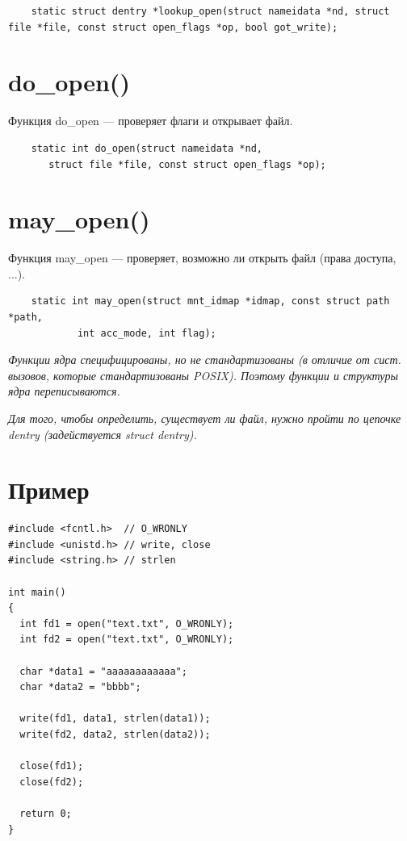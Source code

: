 \begin{lstlisting}
    static struct dentry *lookup_open(struct nameidata *nd, struct file *file, const struct open_flags *op, bool got_write);
\end{lstlisting}

\section{do\_open()}
Функция do\_open --- проверяет флаги и открывает файл.

\begin{lstlisting}
    static int do_open(struct nameidata *nd,
       struct file *file, const struct open_flags *op);
\end{lstlisting}

\section{may\_open()}
Функция may\_open --- проверяет, возможно ли открыть файл (права доступа, ...).

\begin{lstlisting}
    static int may_open(struct mnt_idmap *idmap, const struct path *path,
		    int acc_mode, int flag);
\end{lstlisting}

\textit{
Функции ядра специфицированы, но не стандартизованы (в отличие от сист. вызовов, которые стандартизованы POSIX). Поэтому функции и структуры ядра переписываются.}

\textit{
Для того, чтобы определить, существует ли файл, нужно пройти по цепочке dentry (задействуется struct dentry).}

\section{Пример}
\begin{lstlisting}
#include <fcntl.h>  // O_WRONLY
#include <unistd.h> // write, close
#include <string.h> // strlen

int main()
{
  int fd1 = open("text.txt", O_WRONLY);
  int fd2 = open("text.txt", O_WRONLY);

  char *data1 = "aaaaaaaaaaaa";
  char *data2 = "bbbb";

  write(fd1, data1, strlen(data1));
  write(fd2, data2, strlen(data2));

  close(fd1);
  close(fd2);

  return 0;
}
\end{lstlisting}

